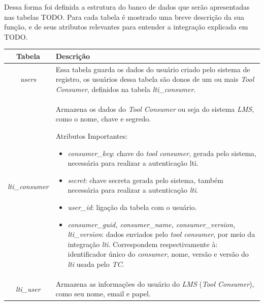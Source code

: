 Dessa forma foi definida a estrutura do banco de dados que serão apresentadas nas tabelas TODO. Para cada tabela é mostrado uma breve descrição da sua função, e de seus atributos relevantes para entender a integração explicada em TODO.
\begin{table}[htp]
    \begin{center}
        \begin{tabular}{|c|p{11cm}|}
            \hline \textbf{Tabela} & \textbf{Descrição} \\
            \hline \textit{users} &
                Essa tabela guarda os dados do usuário criado pelo sistema de registro, os usuários dessa tabela são donos de um ou mais \textit{Tool Consumer}, definidos na tabela \textit{lti\_consumer}.
             \\ 
            \hline \textit{lti\_consumer} &
                Armazena os dados do \textit{Tool Consumer} ou seja do sistema \textit{LMS}, como o nome, chave e segredo.
                
                Atributos Importantes:
                \begin{itemize}
                    \item \textit{consumer\_key}: chave do \textit{tool consumer}, gerada pelo sistema, necessária para realizar a autenticação lti.
                    \item \textit{secret}: chave secreta gerada pelo sistema, também necessária para realizar a autenticação \textit{lti}.
                    \item \textit{user\_id}: ligação da tabela com o usuário.
                    \item \textit{consumer\_guid, consumer\_name, consumer\_version, lti\_version}: dados enviados pelo \textit{tool consumer}, por meio da integração \textit{lti}. Correspondem respectivamente à: identificador único do \textit{consumer}, nome, versão e versão do \textit{lti} usada pelo \textit{TC}.
                \end{itemize}
              \\ 
              \hline \textit{lti\_user} &
                  Armazena as informações do usuário do \textit{LMS} (\textit{Tool Consumer}), como seu nome, email e papel.
                  

\end{tabular}
\end{center}
\end{table}
